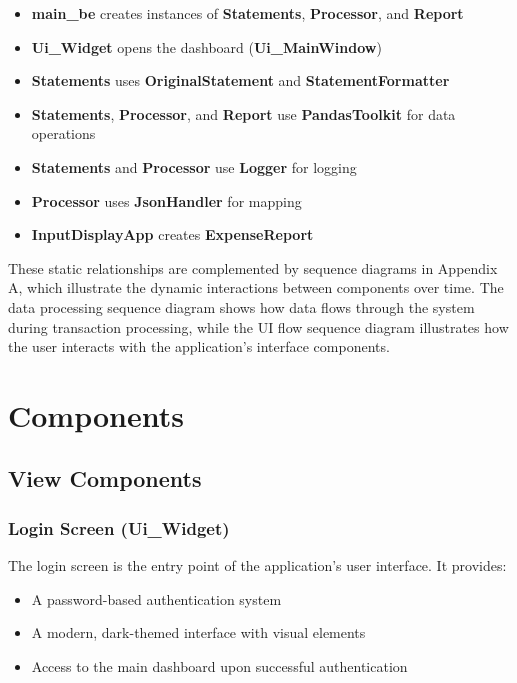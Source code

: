 \documentclass[11pt,a4paper]{report}
\begin{document}
\begin{itemize}
    \item \textbf{main\_be} creates instances of \textbf{Statements}, \textbf{Processor}, and \textbf{Report}
    \item \textbf{Ui\_Widget} opens the dashboard (\textbf{Ui\_MainWindow})
    \item \textbf{Statements} uses \textbf{OriginalStatement} and \textbf{StatementFormatter}
    \item \textbf{Statements}, \textbf{Processor}, and \textbf{Report} use \textbf{PandasToolkit} for data operations
    \item \textbf{Statements} and \textbf{Processor} use \textbf{Logger} for logging
    \item \textbf{Processor} uses \textbf{JsonHandler} for mapping
    \item \textbf{InputDisplayApp} creates \textbf{ExpenseReport}
\end{itemize}

These static relationships are complemented by sequence diagrams in Appendix A, which illustrate the dynamic interactions between components over time. The data processing sequence diagram shows how data flows through the system during transaction processing, while the UI flow sequence diagram illustrates how the user interacts with the application's interface components.

\chapter{Components}

\section{View Components}

\subsection{Login Screen (Ui\_Widget)}
The login screen is the entry point of the application's user interface. It provides:
\begin{itemize}
    \item A password-based authentication system
    \item A modern, dark-themed interface with visual elements
    \item Access to the main dashboard upon successful authentication
\end{itemize}
\end{document}
